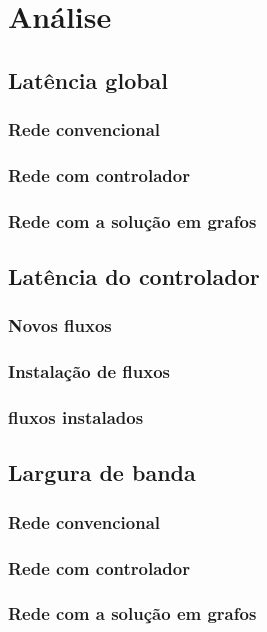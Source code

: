 \chapter{Análise}


\section{Latência global}

\subsection{Rede convencional}
\subsection{Rede com controlador}
\subsection{Rede com a solução em grafos}


\section{Latência do controlador}

\subsection{Novos fluxos}
\subsection{Instalação de fluxos}
\subsection{fluxos instalados}


\section{Largura de banda}

\subsection{Rede convencional}
\subsection{Rede com controlador}
\subsection{Rede com a solução em grafos}


